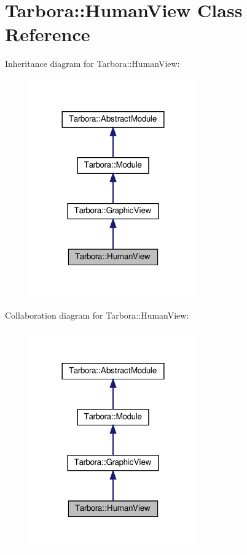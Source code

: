 \hypertarget{classTarbora_1_1HumanView}{}\section{Tarbora\+:\+:Human\+View Class Reference}
\label{classTarbora_1_1HumanView}


Inheritance diagram for Tarbora\+:\+:Human\+View\+:
\nopagebreak
\begin{figure}[H]
\begin{center}
\leavevmode
\includegraphics[width=204pt]{classTarbora_1_1HumanView__inherit__graph}
\end{center}
\end{figure}


Collaboration diagram for Tarbora\+:\+:Human\+View\+:
\nopagebreak
\begin{figure}[H]
\begin{center}
\leavevmode
\includegraphics[width=204pt]{classTarbora_1_1HumanView__coll__graph}
\end{center}
\end{figure}
